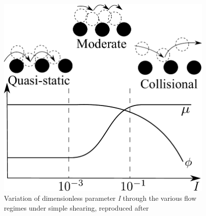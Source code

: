 \begin{figure}[tbhp]
\centering
\includegraphics[width=0.95\textwidth]{Regime}
\caption[Variation of dimensionless parameter \textit{I} for various flow 
regimes]{Variation of dimensionless parameter \textit{I} through the various 
flow regimes under simple shearing, reproduced after~\citep{Kamrin2008}}
\label{fig:Regime}
\end{figure}


